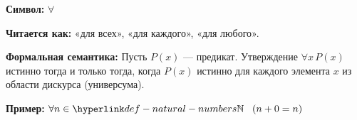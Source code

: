 

\hypertarget{def-forall}{}
\begin{definition} %



\textbf{Символ:} $\forall$

\textbf{Читается как:} «для всех», «для каждого», «для любого».

\textbf{Формальная семантика:}
Пусть $P(x)$ — предикат. Утверждение $\forall x\, P(x)$ истинно тогда и только тогда,
когда $P(x)$ истинно для каждого элемента $x$ из области дискурса (универсума).

\textbf{Пример:} $\forall n \in \NaturalNumbers\; (n + 0 = n)$
\end{definition}